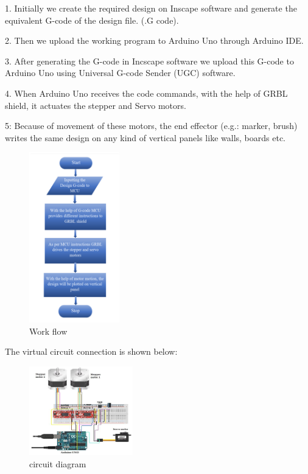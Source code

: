 \documentclass[conference]{IEEEtran}
\begin{document}
1. Initially we create the required design on Inscape software
and generate the equivalent G-code of the design file. (.G
code).


\vspace{5pt}


2. Then we upload the working program to Arduino Uno
through Arduino IDE.


\vspace{5pt}


3. After generating the G-code in Incscape software we upload
this G-code to Arduino Uno using Universal G-code Sender
(UGC) software.


\vspace*{5pt}


4. When Arduino Uno receives the code commands, with the
help of GRBL shield, it actuates the stepper and Servo motors.


\vspace{5pt}


5: Because of movement of these motors, the end effector (e.g.:
marker, brush) writes the same design on any kind of vertical
panels like walls, boards etc.

\clearpage

\begin{figure}[h]
    \centering
    \includegraphics[width=0.35\textwidth]{work.png}
    \caption{Work flow}
\end{figure}
The virtual circuit connection is shown below:
\begin{figure}[h]
    \centering
    \includegraphics[width=0.40\textwidth]{circuit.png}
    \caption{circuit diagram}
\end{figure}
\end{document}
